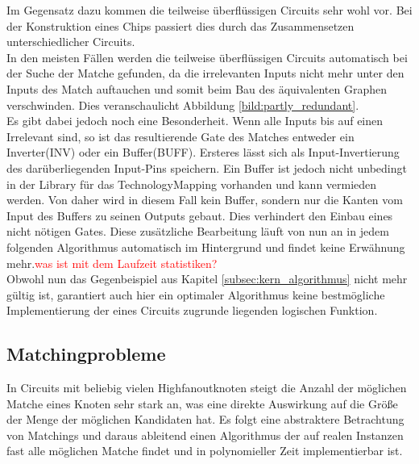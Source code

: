 \documentclass[11pt, a4paper, german]{article}
\newcommand{\TM}{TechnologyMapping }
\begin{document}
Im Gegensatz dazu kommen die teilweise überflüssigen Circuits sehr wohl vor. Bei der Konstruktion eines Chips passiert dies durch das Zusammensetzen unterschiedlicher Circuits.\\
In den meisten Fällen werden die teilweise überflüssigen Circuits automatisch bei der  Suche der Matche gefunden, da die irrelevanten Inputs nicht mehr unter den Inputs des Match auftauchen und somit beim Bau des äquivalenten Graphen verschwinden. Dies veranschaulicht Abbildung \ref{bild:partly_redundant}. \\
Es gibt dabei jedoch noch eine Besonderheit. Wenn alle Inputs bis auf einen Irrelevant sind, so ist das resultierende Gate des Matches entweder ein Inverter(INV) oder ein Buffer(BUFF). Ersteres lässt sich als Input-Invertierung des darüberliegenden Input-Pins speichern. Ein Buffer ist jedoch nicht unbedingt in der Library für das \TM vorhanden und kann vermieden werden. Von daher wird in diesem Fall kein Buffer, sondern nur die Kanten vom Input des Buffers zu seinen Outputs gebaut. Dies verhindert den Einbau eines nicht nötigen Gates. Diese zusätzliche Bearbeitung läuft von nun an in jedem folgenden Algorithmus automatisch im Hintergrund und findet keine Erwähnung mehr.\textcolor{red}{was ist mit dem Laufzeit statistiken?}\\
 Obwohl nun das Gegenbeispiel aus Kapitel \ref{subsec:kern_algorithmus} nicht mehr gültig ist, garantiert auch hier ein optimaler Algorithmus keine bestmögliche Implementierung der eines Circuits zugrunde liegenden logischen Funktion.
 
 
\subsection{Matchingprobleme}
\label{subsec:match_kandidaten}
In Circuits mit beliebig vielen Highfanoutknoten steigt die Anzahl der möglichen Matche eines Knoten sehr stark an, was eine direkte Auswirkung auf die Größe der Menge der möglichen Kandidaten hat. Es folgt eine abstraktere Betrachtung von Matchings und daraus ableitend einen Algorithmus der auf realen Instanzen fast alle möglichen Matche findet und in polynomieller Zeit implementierbar ist.
\end{document}
